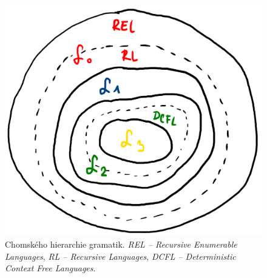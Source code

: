 \begin{figure}[H]
    \centering
    \includegraphics[width=0.6\linewidth]{chomsky_hierarchy.pdf}
    \caption{Chomského hierarchie gramatik. \textit{REL -- Recursive Enumerable Languages}, \textit{RL -- Recursive Languages}, \textit{DCFL -- Deterministic Context Free Languages}.}
\end{figure}

